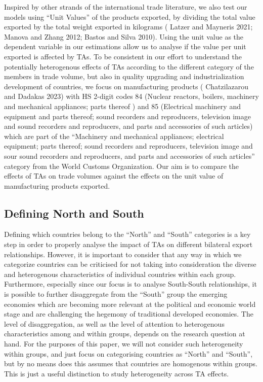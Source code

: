 \documentclass[12pt]{article}%
\begin{document}
%
Inspired by other strands of the international trade literature, we also
test our models using ``Unit Values'' of the products exported, by
dividing the total value exported by the total weight exported in
kilograms (\cite{latzer_average_2021} Latzer and Mayneris 2021; \cite{manova_export_2012} Manova and Zhang 2012; \cite{bastos_quality_2010} Bastos and
Silva 2010). Using the unit value as the dependent variable in our
estimations allow us to analyse if the value per unit exported is
affected by TAs. To be consistent in our effort to understand the
potentially heterogenous effects of TAs according to the different
category of the members in trade volume, but also in quality upgrading
and industrialization development of countries, we focus on
manufacturing products (\cite{chatzilazarou_trade_2023} Chatzilazarou and Dadakas 2023) with HS 2-digit
codes 84 (Nuclear reactors, boilers, machinery and mechanical
appliances; parts thereof ) and 85 (Electrical machinery and equipment
and parts thereof; sound recorders and reproducers, television image and
sound recorders and reproducers, and parts and accessories of such
articles) which are part of the ``Machinery and mechanical appliances;
electrical equipment; parts thereof; sound recorders and reproducers,
television image and sour sound recorders and reproducers, and parts and
accessories of such articles'' category from the World Customs
Organization. Our aim is to compare the effects of TAs on trade volumes
against the effects on the unit value of manufacturing products
exported.%
\subsection{Defining North and South}%
\label{subsec:DefiningNorthandSouth}%

%
Defining which countries belong to the ``North'' and ``South''
categories is a key step in order to properly analyse the impact of TAs
on different bilateral export relationships. However, it is important to
consider that any way in which we categorize countries can be criticised
for not taking into consideration the diverse and heterogenous
characteristics of individual countries within each group. Furthermore,
especially since our focus is to analyse South-South relationships, it
is possible to further disaggregate from the ``South'' group the
emerging economies which are becoming more relevant at the political and
economic world stage and are challenging the hegemony of traditional
developed economies. The level of disaggregation, as well as the level
of attention to heterogenous characteristics among and within groups,
depends on the research question at hand. For the purposes of this
paper, we will not consider such heterogeneity within groups, and just
focus on categorising countries as ``North'' and ``South'', but by no
means does this assumes that countries are homogenous within groups.
This is just a useful distinction to study heterogeneity across TA
effects.
\end{document}
